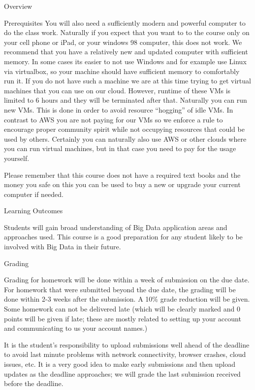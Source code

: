 \begin{edXchapter}{Overview}
\begin{edXsection}{Prerequisites}
You will also need a sufficiently modern and powerful computer to do the
class work. Naturally if you expect that you want to to the course only
on your cell phone or iPad, or your windows 98 computer, this does not
work. We recommend that you have a relatively new and updated computer
with sufficient memory. In some cases its easier to not use Windows and
for example use Linux via virtualbox, so your machine should have
sufficient memory to comfortably run it. If you do not have such a
machine we are at this time trying to get virtual machines that you can
use on our cloud. However, runtime of these VMs is limited to 6 hours
and they will be terminated after that. Naturally you can run new VMs.
This is done in order to avoid resource ``hogging'' of idle VMs. In
contrast to AWS you are not paying for our VMs so we enforce a rule to
encourage proper community spirit while not occupying resources that
could be used by others. Certainly you can naturally also use AWS or
other clouds where you can run virtual machines, but in that case you
need to pay for the usage yourself.

Please remember that this course does not have a required text books and
the money you safe on this you can be used to buy a new or upgrade your
current computer if needed.

\end{edXsection}
\begin{edXsection}{Learning Outcomes}\label{learning-outcomes}

Students will gain broad understanding of Big Data application areas and
approaches used. This course is a good preparation for any student
likely to be involved with Big Data in their future.

\end{edXsection}
\begin{edXsection}{Grading}\label{grading}

Grading for homework will be done within a week of submission on the due
date. For homework that were submitted beyond the due date, the grading
will be done within 2-3 weeks after the submission. A 10\% grade
reduction will be given. Some homework can not be delivered late (which
will be clearly marked and 0 points will be given if late; these are
mostly related to setting up your account and communicating to us your
account names.)

It is the student's responsibility to upload submissions well ahead of
the deadline to avoid last minute problems with network connectivity,
browser crashes, cloud issues, etc. It is a very good idea to make early
submissions and then upload updates as the deadline approaches; we will
grade the last submission received before the deadline.


\end{edXsection}
\end{edXchapter}
